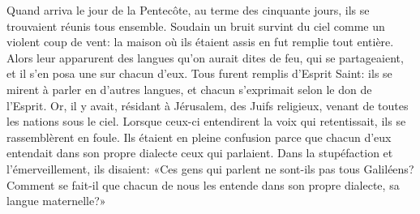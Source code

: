 Quand arriva le jour de la Pentecôte, au terme des cinquante jours,
	ils se trouvaient réunis tous ensemble.
Soudain un bruit survint du ciel comme un violent coup de vent:
	la maison où ils étaient assis en fut remplie tout entière.
Alors leur apparurent des langues qu’on aurait dites de feu,
	qui se partageaient,
	et il s’en posa une sur chacun d’eux.
Tous furent remplis d’Esprit Saint:
	ils se mirent à parler en d’autres langues,
	et chacun s’exprimait selon le don de l’Esprit.
Or, il y avait, résidant à Jérusalem,
	des Juifs religieux, venant de toutes les nations sous le ciel.
Lorsque ceux-ci entendirent la voix qui retentissait,
	ils se rassemblèrent en foule.
Ils étaient en pleine confusion
	parce que chacun d’eux entendait dans son propre dialecte ceux qui parlaient.
Dans la stupéfaction et l’émerveillement, ils disaient:
	«Ces gens qui parlent ne sont-ils pas tous Galiléens?
	Comment se fait-il que chacun de nous les entende dans son propre dialecte,
	sa langue maternelle?»
